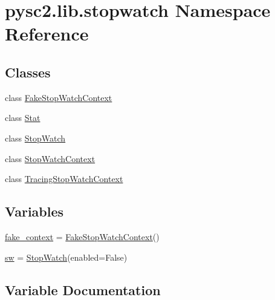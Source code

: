 \hypertarget{namespacepysc2_1_1lib_1_1stopwatch}{}\section{pysc2.\+lib.\+stopwatch Namespace Reference}
\label{namespacepysc2_1_1lib_1_1stopwatch}
\subsection*{Classes}
\begin{DoxyCompactItemize}
\item 
class \mbox{\hyperlink{classpysc2_1_1lib_1_1stopwatch_1_1_fake_stop_watch_context}{Fake\+Stop\+Watch\+Context}}
\item 
class \mbox{\hyperlink{classpysc2_1_1lib_1_1stopwatch_1_1_stat}{Stat}}
\item 
class \mbox{\hyperlink{classpysc2_1_1lib_1_1stopwatch_1_1_stop_watch}{Stop\+Watch}}
\item 
class \mbox{\hyperlink{classpysc2_1_1lib_1_1stopwatch_1_1_stop_watch_context}{Stop\+Watch\+Context}}
\item 
class \mbox{\hyperlink{classpysc2_1_1lib_1_1stopwatch_1_1_tracing_stop_watch_context}{Tracing\+Stop\+Watch\+Context}}
\end{DoxyCompactItemize}
\subsection*{Variables}
\begin{DoxyCompactItemize}
\item 
\mbox{\hyperlink{namespacepysc2_1_1lib_1_1stopwatch_a81fcf5689eff012beae495cd3446ab6c}{fake\+\_\+context}} = \mbox{\hyperlink{classpysc2_1_1lib_1_1stopwatch_1_1_fake_stop_watch_context}{Fake\+Stop\+Watch\+Context}}()
\item 
\mbox{\hyperlink{namespacepysc2_1_1lib_1_1stopwatch_af902a678c1100412f8e448b4eb06e849}{sw}} = \mbox{\hyperlink{classpysc2_1_1lib_1_1stopwatch_1_1_stop_watch}{Stop\+Watch}}(enabled=False)
\end{DoxyCompactItemize}


\subsection{Variable Documentation}
\mbox{\label{namespacepysc2_1_1lib_1_1stopwatch_a81fcf5689eff012beae495cd3446ab6c}} 
